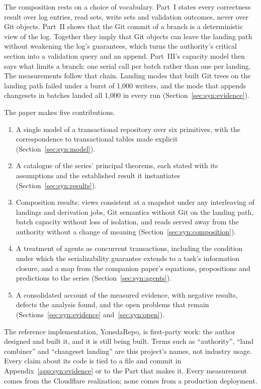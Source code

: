 \documentclass[11pt,letterpaper]{article}
\theoremstyle{definition}
\theoremstyle{remark}
\begin{document}
The composition rests on a choice of vocabulary. Part~I states every correctness result over log entries, read sets, write sets and validation outcomes, never over Git objects. Part~II shows that the Git commit of a branch is a deterministic view of the log. Together they imply that Git objects can leave the landing path without weakening the log's guarantees, which turns the authority's critical section into a validation query and an append. Part~III's capacity model then says what limits a branch: one serial call per batch rather than one per landing. The measurements follow that chain. Landing modes that built Git trees on the landing path failed under a burst of 1,000 writers, and the mode that appends changesets in batches landed all 1,000 in every run (Section~\ref{sec:syn:evidence}). %

The paper makes five contributions.
\begin{enumerate}
\item A single model of a transactional repository over six primitives, with the correspondence to transactional tables made explicit (Section~\ref{sec:syn:model}).
\item A catalogue of the series' principal theorems, each stated with its assumptions and the established result it instantiates (Section~\ref{sec:syn:results}).
\item Composition results: views consistent at a snapshot under any interleaving of landings and derivation jobs, Git semantics without Git on the landing path, batch capacity without loss of isolation, and reads served away from the authority without a change of meaning (Section~\ref{sec:syn:composition}).
\item A treatment of agents as concurrent transactions, including the condition under which the serializability guarantee extends to a task's information closure, and a map from the companion paper's equations, propositions and predictions to the series (Section~\ref{sec:syn:agents}).
\item A consolidated account of the measured evidence, with negative results, defects the analysis found, and the open problems that remain (Sections~\ref{sec:syn:evidence} and~\ref{sec:syn:open}).
\end{enumerate}

The reference implementation, YonedaRepo, is first-party work: the author designed and built it, and it is still being built. Terms such as ``authority'', ``land combiner'' and ``changeset landing'' are this project's names, not industry usage. Every claim about its code is tied to a file and commit in Appendix~\ref{app:syn:evidence} or to the Part that makes it. Every measurement comes from the Cloudflare realization; none comes from a production deployment.
\end{document}
